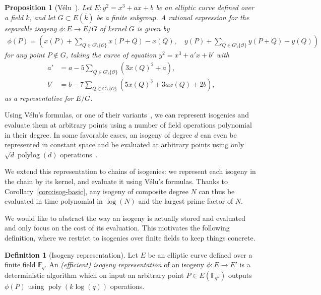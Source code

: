 \documentclass[10pt]{article}
\theoremstyle{plain}
\newtheorem{proposition}[theorem]{Proposition}
\theoremstyle{definition}
\newtheorem{definition}[theorem]{Definition}
\DeclareMathOperator{\poly}{poly}
\DeclareMathOperator{\polylog}{polylog}
\def\F{\ensuremath{\mathbb{F}}}
\def\O{\ensuremath{\mathcal{O}}}
\begin{document}
\begin{proposition}[{Vélu~\cite{velu71}}]
  \label{th:velu}
  Let $E:y^2=x^3+ax+b$ be an elliptic curve defined over a field $k$,
  and let $G⊂E(\bar{k})$ be a finite subgroup. %
  A rational expression for the separable isogeny $ϕ:E→ E/G$ of kernel
  $G$ is given by
  \begin{align*}
    ϕ(P) = \left(
      x(P) + \sum_{Q∈G\setminus\{\O\}}x(P+Q)-x(Q),\quad
      y(P) + \sum_{Q∈G\setminus\{\O\}}y(P+Q)-y(Q)
    \right)
  \end{align*} %
  for any point $P ∉ G$, taking the curve of equation $y^2=x^3+a'x+b'$
  with
  \begin{align*}
    a' &= a - 5\sum_{Q∈G\setminus\{\O\}}(3x(Q)^2+a),\\
    b' &= b - 7\sum_{Q∈G\setminus\{\O\}}(5x(Q)^3+3ax(Q)+2b),
  \end{align*}
  as a representative for $E/G$.
\end{proposition}

Using Vélu's formulas, or one of their
variants~\cite{moody2016analogues,AC:CosHis17,PQCRYPTO:Renes18}, we
can represent isogenies and evaluate them at arbitrary points using a
number of field operations polynomial in their degree. %
In some favorable cases, an isogeny of degree $d$ can even be
represented in constant space and be evaluated at arbitrary points
using only $\sqrt{d}\polylog(d)$
operations~\cite{bernstein2020faster}. %

We extend this representation to chains of isogenies: we represent
each isogeny in the chain by its kernel, and evaluate it using Vélu's
formulas. %
Thanks to Corollary~\ref{coro:isog-basic}, any isogeny of composite
degree $N$ can thus be evaluated in time polynomial in $\log(N)$ and
the largest prime factor of $N$.

We would like to abstract the way an isogeny is actually stored and
evaluated and only focus on the cost of its evaluation. %
This motivates the following definition, where we restrict to
isogenies over finite fields to keep things concrete.

\begin{definition}[Isogeny representation]
  \label{def:isog-repr}
  Let $E$ be an elliptic curve defined over a finite field $\F_q$. %
  An \emph{(efficient) isogeny representation} of an isogeny $ϕ:E→E'$
  is a deterministic algorithm which on input an arbitrary point
  $P ∈ E(\F_{q^k})$ outputs $ϕ(P)$ using $\poly(k\log(q))$ operations.
\end{definition}
\end{document}
